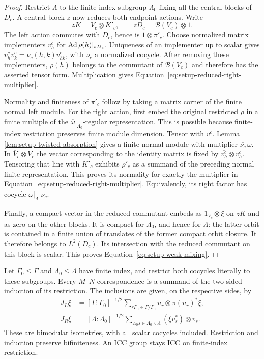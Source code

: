 \begin{proof}
Restrict $\Lambda$ to the finite-index subgroup $\Lambda_0$ fixing
all the central blocks of $D_c$.  A central block $z$ now reduces both
endpoint actions.  Write
\[
 zK=V_c\otimes K'_c,
 \qquad zD_c=\mathcal B(V_c)\otimes1.
\]
The left action commutes with $D_c$, hence is $1\otimes\pi'_c$.
Choose normalized matrix implementers $v^c_h$ for
$\operatorname{Ad}\rho(h)|_{zD_c}$.  Uniqueness of an implementer up to scalar
gives
$v^c_hv^c_k=\nu_c(h,k)v^c_{hk}$, with $\nu_c$ a normalized cocycle.
After removing these implementers, $\rho(h)$ belongs to the
commutant of $\mathcal B(V_c)$ and therefore has the asserted tensor
form.  Multiplication gives
Equation~\eqref{eq:setup-reduced-right-multiplier}.

Normality and finiteness of $\pi'_c$ follow by taking a matrix corner
of the finite normal left module.  For the right action, first embed
the original restricted $\rho$ in a finite multiple of the
$\overline\omega|_{\Lambda_0}$-regular representation.  This is
possible because finite-index restriction preserves finite module
dimension.  Tensor with $\overline{v^c}$.  Lemma~
\ref{lem:setup-twisted-absorption} gives a finite normal module with
multiplier $\overline{\nu_c}\,\overline\omega$.  In
$\overline V_c\otimes V_c$ the vector corresponding to the identity
matrix is fixed by $\overline{v^c_h}\otimes v^c_h$.  Tensoring that
line with $K'_c$ exhibits $\rho'_c$ as a summand of the preceding
normal finite representation.  This proves its normality for exactly
the multiplier in Equation~\eqref{eq:setup-reduced-right-multiplier}.
Equivalently, its right factor has cocycle
$\omega|_{\Lambda_0}\nu_c$.

Finally, a compact vector in the reduced commutant embeds as
$1_{V_c}\otimes\xi$ on $zK$ and as zero on the other blocks.  It is
compact for $\Lambda_0$, and hence for $\Lambda$: the latter orbit
is contained in a finite union of translates of the former compact
orbit closure.  It therefore belongs to $L^2(D_c)$.  Its intersection
with the reduced commutant on this block is scalar.  This proves
Equation~\eqref{eq:setup-weak-mixing}.
\end{proof}

\begin{lemma}
\label{lem:setup-finite-index-induction}
Let $\Gamma_0\leq\Gamma$ and $\Lambda_0\leq\Lambda$ have finite
index, and restrict both cocycles literally to these subgroups.  Every
$M$--$N$ correspondence is a summand of the two-sided induction of
its restriction.  The inclusions are given, on the respective sides,
by
\begin{align}
 J_L\xi&=[\Gamma:\Gamma_0]^{-1/2}
       \sum_{r\Gamma_0\in\Gamma/\Gamma_0}
              u_r\otimes\pi(u_r)^*\xi,
       \label{eq:setup-left-induction}\\
 J_R\xi&=[\Lambda:\Lambda_0]^{-1/2}
       \sum_{\Lambda_0s\in\Lambda_0\backslash\Lambda}
              (\xi v_s^*)\otimes v_s.
       \label{eq:setup-right-induction}
\end{align}
These are bimodular isometries, with all scalar cocycles included.
Restriction and induction preserve bifiniteness.  An ICC group stays
ICC on finite-index restriction.
\end{lemma}

